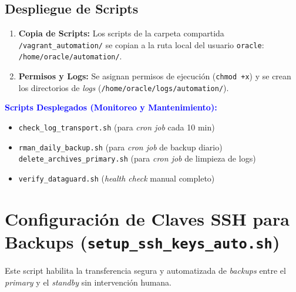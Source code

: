 \documentclass[11pt, a4paper]{report}
\newcommand{\destacado}[1]{\textbf{\textcolor{blue}{#1}}}
\begin{document}
\subsection{Despliegue de Scripts}
\begin{enumerate}
    \item \textbf{Copia de Scripts:} Los scripts de la carpeta compartida \texttt{/vagrant\_automation/} se copian a la ruta local del usuario \texttt{oracle}: \texttt{/home/oracle/automation/}.
\item \textbf{Permisos y Logs:} Se asignan permisos de ejecución (\texttt{chmod +x}) y se crean los directorios de \textit{logs} (\texttt{/home/oracle/logs/automation/}).
\end{enumerate}
\destacado{Scripts Desplegados (Monitoreo y Mantenimiento):}
\begin{itemize}
    \item \texttt{check\_log\_transport.sh} (para \textit{cron job} cada 10 min)
    \item \texttt{rman\_daily\_backup.sh} (para \textit{cron job} de backup diario)
    \texttt{delete\_archives\_primary.sh} (para \textit{cron job} de limpieza de logs)
    \item \texttt{verify\_dataguard.sh} (\textit{health check} manual completo)
\end{itemize}

\section{Configuración de Claves SSH para Backups (\texttt{setup\_ssh\_keys\_auto.sh})}

Este script habilita la transferencia segura y automatizada de \textit{backups} entre el \textit{primary} y el \textit{standby} sin intervención humana.
\end{document}

